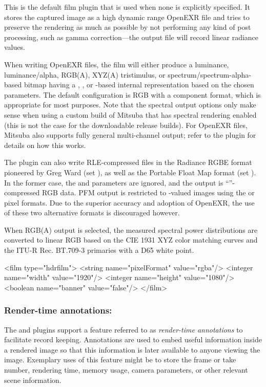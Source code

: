 This is the default film plugin that is used when none is explicitly
specified. It stores the captured image as a high dynamic range OpenEXR file
and tries to preserve the rendering as much as possible by not performing any
kind of post processing, such as gamma correction---the output file
will record linear radiance values.

When writing OpenEXR files, the film will either produce a luminance, luminance/alpha,
RGB(A), XYZ(A) tristimulus, or spectrum/spectrum-alpha-based bitmap having a
, , or -based internal representation
based on the chosen parameters.
The default configuration is RGB with a  component format,
which is appropriate for most purposes. Note that the spectral output options
only make sense when using a custom build of Mitsuba that has spectral
rendering enabled (this is not the case for the downloadable release builds).
For OpenEXR files, Mitsuba also supports fully general multi-channel output;
refer to the  plugin for details on how this works.

The plugin can also write RLE-compressed files in the Radiance RGBE format
pioneered by Greg Ward (set ), as well as the
Portable Float Map format (set ).
In the former case,
the  and  parameters are ignored,
and the output is ``''-compressed RGB data.
PFM output is restricted to -valued images using the
 or  pixel formats.
Due to the superior accuracy and adoption of OpenEXR, the use of these
two alternative formats is discouraged however.

When RGB(A) output is selected, the measured spectral power distributions are
converted to linear RGB based on the CIE 1931 XYZ color matching curves and
the ITU-R Rec. BT.709-3 primaries with a D65 white point.

\begin{xml}[caption=Instantiation of a film that writes a full-HD RGBA OpenEXR file without the Mitsuba banner]
<film type="hdrfilm">
    <string name="pixelFormat" value="rgba"/>
    <integer name="width" value="1920"/>
    <integer name="height" value="1080"/>
    <boolean name="banner" value="false"/>
</film>
\end{xml}

\subsubsection*{Render-time annotations:}
\label{sec:film-annotations}
The  and  plugins support a
feature referred to as \emph{render-time annotations} to facilitate
record keeping.
Annotations are used to embed useful information inside a rendered image so
that this information is later available to anyone viewing the image.
Exemplary uses of this feature might be to store the frame or take number,
rendering time, memory usage, camera parameters, or other relevant scene
information.

